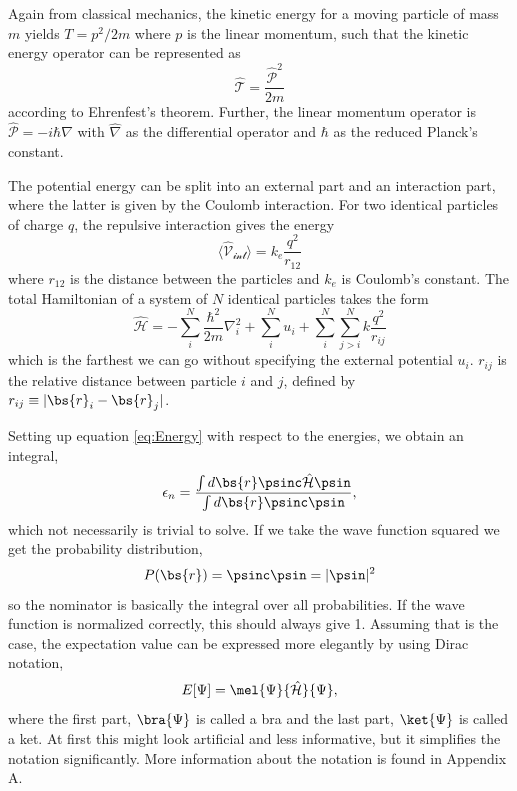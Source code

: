 Again from classical mechanics, the kinetic energy for a moving particle of mass $m$ yields $T=p^2/2m$ where $p$ is the linear momentum, such that the kinetic energy operator can be represented as 
\begin{equation}
\hat{\mathcal{T}}=\frac{\hat{\mathcal{P}}^2}{2m}
\end{equation}
according to Ehrenfest's theorem. Further, the linear momentum operator is $\hat{\mathcal{P}}=-i\hbar\hat{\nabla}$ with $\hat{\nabla}$ as the differential operator and $\hbar$ as the reduced Planck's constant.

The potential energy can be split into an external part and an interaction part, where the latter is given by the Coulomb interaction. For two identical particles of charge $q$, the repulsive interaction gives the energy
\begin{equation}
\langle \mathcal{\hat{V}_{\text{int}}} \rangle=k_e\frac{q^2}{r_{12}}
\end{equation}
where $r_{12}$ is the distance between the particles and $k_e$ is Coulomb's constant. The total Hamiltonian of a system of $N$ identical particles takes the form
\begin{equation}
\hat{\mathcal{H}}=-\sum_i^N\frac{\hbar^2}{2m}\nabla_i^2+\sum_i^{N}u_i + \sum_i^N\sum_{j>i}^Nk\frac{q^2}{r_{ij}}
\label{eq:ElectronicHamiltonian}
\end{equation}
which is the farthest we can go without specifying the external potential $u_i$. $r_{ij}$ is the relative distance between particle $i$ and $j$, defined by $r_{ij}\equiv|\bs{r}_i-\bs{r}_j|$.

Setting up equation \eqref{eq:Energy} with respect to the energies, we obtain an integral,
\begin{equation}
\epsilon_n=\frac{\int d\bs{r}\psinc\hat{\mathcal{H}}\psin}{\int d\bs{r}\psinc\psin},
\label{eq:energyintegral}
\end{equation}
which not necessarily is trivial to solve. If we take the wave function squared we get the probability distribution,
\begin{equation}
P(\bs{r})=\psinc\psin=|\psin|^2
\end{equation}
so the nominator is basically the integral over all probabilities. If the wave function is normalized correctly, this should always give 1. Assuming that is the case, the expectation value can be expressed more elegantly by using Dirac notation,
\begin{equation}
E[\Psi]=\mel{\Psi}{\hat{\mathcal{H}}}{\Psi},
\end{equation}
where the first part, $\bra{\Psi}$ is called a bra and the last part, $\ket{\Psi}$ is called a ket. At first this might look artificial and less informative, but it simplifies the notation significantly. More information about the notation is found in Appendix A. 


